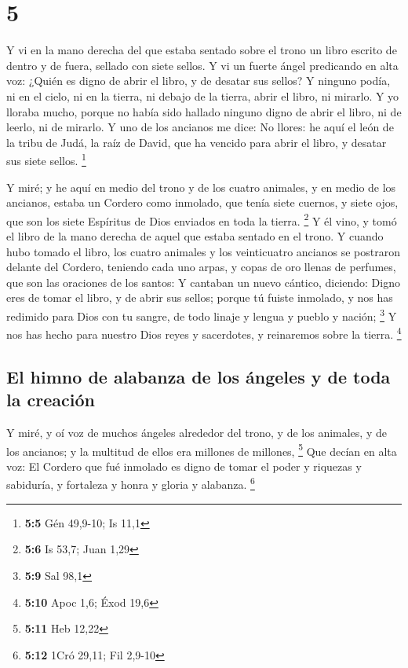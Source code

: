 \hypertarget{section-4}{%
\section{5}\label{section-4}}

 Y vi en la mano derecha del que estaba sentado sobre el
trono un libro escrito de dentro y de fuera, sellado con siete sellos.
 Y vi un fuerte ángel predicando en alta voz: ¿Quién es
digno de abrir el libro, y de desatar sus sellos?  Y
ninguno podía, ni en el cielo, ni en la tierra, ni debajo de la tierra,
abrir el libro, ni mirarlo.  Y yo lloraba mucho, porque no
había sido hallado ninguno digno de abrir el libro, ni de leerlo, ni de
mirarlo.  Y uno de los ancianos me dice: No llores: he
aquí el león de la tribu de Judá, la raíz de David, que ha vencido para
abrir el libro, y desatar sus siete sellos. \footnote{\textbf{5:5} Gén
  49,9-10; Is 11,1}

 Y miré; y he aquí en medio del trono y de los cuatro
animales, y en medio de los ancianos, estaba un Cordero como inmolado,
que tenía siete cuernos, y siete ojos, que son los siete Espíritus de
Dios enviados en toda la tierra. \footnote{\textbf{5:6} Is 53,7; Juan
  1,29}  Y él vino, y tomó el libro de la mano derecha de
aquel que estaba sentado en el trono.  Y cuando hubo
tomado el libro, los cuatro animales y los veinticuatro ancianos se
postraron delante del Cordero, teniendo cada uno arpas, y copas de oro
llenas de perfumes, que son las oraciones de los santos: 
Y cantaban un nuevo cántico, diciendo: Digno eres de tomar el libro, y
de abrir sus sellos; porque tú fuiste inmolado, y nos has redimido para
Dios con tu sangre, de todo linaje y lengua y pueblo y nación;
\footnote{\textbf{5:9} Sal 98,1}  Y nos has hecho para
nuestro Dios reyes y sacerdotes, y reinaremos sobre la tierra.
\footnote{\textbf{5:10} Apoc 1,6; Éxod 19,6}

\hypertarget{el-himno-de-alabanza-de-los-uxe1ngeles-y-de-toda-la-creaciuxf3n}{%
\subsection{El himno de alabanza de los ángeles y de toda la
creación}\label{el-himno-de-alabanza-de-los-uxe1ngeles-y-de-toda-la-creaciuxf3n}}

 Y miré, y oí voz de muchos ángeles alrededor del trono,
y de los animales, y de los ancianos; y la multitud de ellos era
millones de millones, \footnote{\textbf{5:11} Heb 12,22} 
Que decían en alta voz: El Cordero que fué inmolado es digno de tomar el
poder y riquezas y sabiduría, y fortaleza y honra y gloria y alabanza.
\footnote{\textbf{5:12} 1Cró 29,11; Fil 2,9-10}

